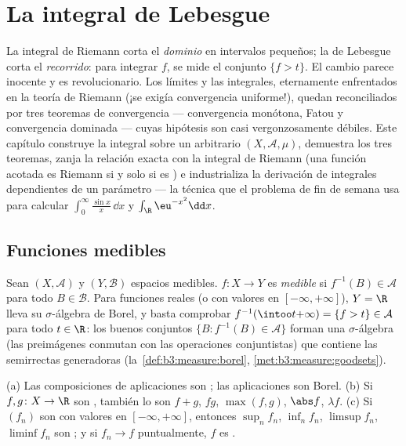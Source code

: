 \chapter{La integral de Lebesgue}\label{ch:b3:lebesgue}

La integral de Riemann corta el \emph{dominio} en intervalos pequeños;
la de Lebesgue corta el \emph{recorrido}: para integrar $f$, se
mide el conjunto $\{f > t\}$. El cambio
parece inocente y es revolucionario. Los límites y las integrales,
eternamente enfrentados en la teoría de Riemann (¡se exigía convergencia
uniforme!), quedan reconciliados por tres teoremas de convergencia ---
convergencia monótona, Fatou y convergencia dominada --- cuyas hipótesis
son casi vergonzosamente débiles. Este capítulo construye la integral
sobre un  arbitrario
$(X, \mathcal A,
\mu)$, demuestra los tres teoremas, zanja la relación exacta con la
integral de Riemann (una función acotada es
 Riemann si y solo si es
) e industrializa la
derivación de integrales dependientes de un parámetro --- la técnica que
el problema de fin de semana usa para calcular
$\int_0^\infty\frac{\sin x}x\,\dd x$ y
$\int_\R \eu^{-x^2}\dd x$.

\section{Funciones medibles}

\begin{definition}\label{def:b3:lebesgue:measurable}
Sean $(X, \mathcal A)$ y $(Y, \mathcal B)$ espacios medibles.
$f \colon X \to Y$ es \emph{medible} si
$f^{-1}(B) \in \mathcal A$ para todo $B \in
\mathcal B$. Para funciones reales (o con valores en
$[-\infty,+\infty]$), $Y = \R$ lleva su $\sigma$-álgebra de Borel, y
basta comprobar $f^{-1}(\intoo t{+\infty}) = \{f > t\} \in
\mathcal A$ para todo $t \in \R$: los buenos conjuntos $\{B :
f^{-1}(B) \in \mathcal A\}$ forman una $\sigma$-álgebra (las preimágenes
conmutan con las operaciones conjuntistas) que contiene las semirrectas
generadoras (la~\cref{def:b3:measure:borel},
\cref{met:b3:measure:goodsets}).
\end{definition}

\begin{proposition}\label{prop:b3:lebesgue:stability}
(a) Las composiciones de aplicaciones
 son
; las
aplicaciones  son
 Borel. (b) Si
$f, g \colon X \to \R$ son
, también lo son $f + g$,
$fg$, $\max(f,g)$, $\abs f$, $\lambda f$.
(c) Si $(f_n)$ son  con
valores en $[-\infty, +\infty]$, entonces $\sup_nf_n$, $\inf_nf_n$,
$\limsup f_n$, $\liminf f_n$ son
; y si $f_n \to f$
puntualmente, $f$ es .
\end{proposition}

